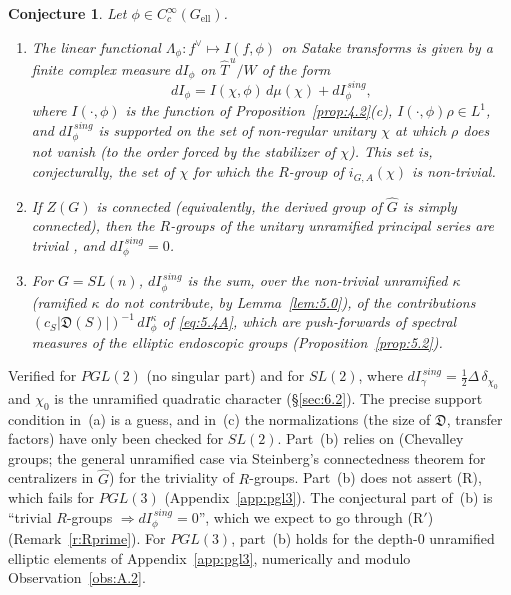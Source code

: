 \documentclass[12pt,letterpaper]{article}
\numberwithin{equation}{section}
\theoremstyle{plain}
\newtheorem{conjecture}[lemma]{Conjecture}
\theoremstyle{remark}
\theoremstyle{plain}
\theoremstyle{definition}
\theoremstyle{remark}
\theoremstyle{remark}
\newcommand{\Thu}{\widehat{T}^{\,u}}
\newcommand{\ellr}{\mathrm{ell}}
\begin{document}
\begin{conjecture}\label{conj:4.6}
Let $\phi\in C_c^\infty(G_{\ellr})$.
\begin{enumerate}[label=(\alph*)]
\item The linear functional $\Lambda_\phi:f^\vee\mapsto I(f,\phi)$ on Satake transforms is given by a finite complex measure $dI_\phi$ on $\Thu/W$ of the form
\[
dI_\phi=I(\chi,\phi)\,d\mu(\chi)+dI^{\,sing}_\phi,
\]
where $I(\cdot,\phi)$ is the function of Proposition~\ref{prop:4.2}(c), $I(\cdot,\phi)\rho\in L^1$, and $dI^{\,sing}_\phi$ is supported on the set of non-regular unitary $\chi$ at which $\rho$ does not vanish (to the order forced by the stabilizer of $\chi$). This set is, conjecturally, the set of $\chi$ for which the $R$-group of $i_{G,A}(\chi)$ is non-trivial.
\item If $Z(G)$ is connected (equivalently, the derived group of $\hat G$ is simply connected), then the $R$-groups of the unitary unramified principal series are trivial \cite{Ke82}, and $dI^{\,sing}_\phi=0$.
\item For $G=SL(n)$, $dI^{\,sing}_\phi$ is the sum, over the non-trivial unramified $\kappa$ (ramified $\kappa$ do not contribute, by Lemma~\ref{lem:5.0}), of the contributions $(c_S|\mathfrak D(S)|)^{-1}\,dI^\kappa_\phi$ of \eqref{eq:5.4A}, which are push-forwards of spectral measures of the elliptic endoscopic groups (Proposition~\ref{prop:5.2}).
\end{enumerate}
\end{conjecture}

\begin{rem26}\label{r:C46}
Verified for $PGL(2)$ (no singular part) and for $SL(2)$, where $dI^{\,sing}_\gamma=\tfrac12\Delta\,\delta_{\chi_0}$ and $\chi_0$ is the unramified quadratic character (\S\ref{sec:6.2}). The precise support condition in~(a) is a guess, and in~(c) the normalizations (the size of $\mathfrak D$, transfer factors) have only been checked for $SL(2)$. Part~(b) relies on \cite{Ke82} (Chevalley groups; the general unramified case via Steinberg's connectedness theorem for centralizers in $\hat G$) for the triviality of $R$-groups. Part~(b) does not assert (R), which fails for $PGL(3)$ (Appendix~\ref{app:pgl3}). The conjectural part of~(b) is ``trivial $R$-groups $\Rightarrow dI^{\,sing}_\phi=0$'', which we expect to go through (R$'$) (Remark~\ref{r:Rprime}). For $PGL(3)$, part~(b) holds for the depth-$0$ unramified elliptic elements of Appendix~\ref{app:pgl3}, numerically and modulo Observation~\ref{obs:A.2}.
\end{rem26}
\end{document}
